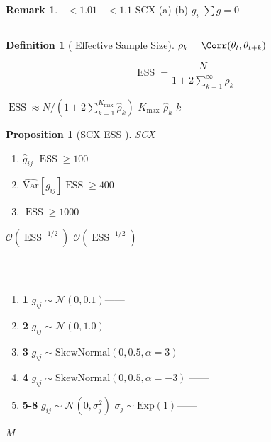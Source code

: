 \documentclass[12pt,a4paper]{article}
\theoremstyle{plain}
\newtheorem{proposition}[theorem]{ Proposition}
\theoremstyle{definition}
\newtheorem{definition}[theorem]{ Definition}
\newtheorem{remark}[theorem]{ Remark}
\newcommand{\Var}{\mathrm{Var}}
\newcommand{\Ocal}{\mathcal{O}}
\newcommand{\Ncal}{\mathcal{N}}
\DeclareMathOperator{\ESS}{ESS}
\DeclareMathOperator{\Rhat}{\hat{R}}
\begin{document}
\begin{remark}
$\Rhat < 1.01$  $\Rhat < 1.1$ 
SCX (a) 
(b)  $g_i$ 
$\sum g = 0$ 
\end{remark}

\subsection{}

\begin{definition}[ Effective Sample Size]
 $\rho_k = \Corr(\theta_t, \theta_{t+k})$ 


\begin{equation}\label{eq:ess_def}
    \ESS = \frac{N}{1 + 2 \sum_{k=1}^\infty \rho_k}
\end{equation}


$\ESS \approx N / (1 + 2 \sum_{k=1}^{K_{\max}} \hat{\rho}_k)$
 $K_{\max}$  $\hat{\rho}_k$  $k$
\end{definition}

\begin{proposition}[SCX  ESS ]
 SCX 
\begin{enumerate}[label=(\arabic*)]
    \item $\hat{g}_{ij}$ $\ESS \geq 100$
    \item $\widehat{\Var}[g_{ij}]$$\ESS \geq 400$
    \item $\ESS \geq 1000$
\end{enumerate}
 $\Ocal(\ESS^{-1/2})$
 $\Ocal(\ESS^{-1/2})$
\end{proposition}

\subsection{}

\begin{algobox}
 $\Rhat$ \textbf{}

\begin{enumerate}
    \item \textbf{ 1} $g_{ij} \sim \Ncal(0, 0.1)$——
    \item \textbf{ 2} $g_{ij} \sim \Ncal(0, 1.0)$——
    \item \textbf{ 3} $g_{ij} \sim \text{SkewNormal}(0, 0.5, \alpha=3)$
        ——
    \item \textbf{ 4} $g_{ij} \sim \text{SkewNormal}(0, 0.5, \alpha=-3)$
        ——
    \item \textbf{ 5-8} $g_{ij} \sim \Ncal(0, \sigma_j^2)$ 
        $\sigma_j \sim \text{Exp}(1)$——
\end{enumerate}

 $M$  $\Rhat$
\end{algobox}
\end{document}
